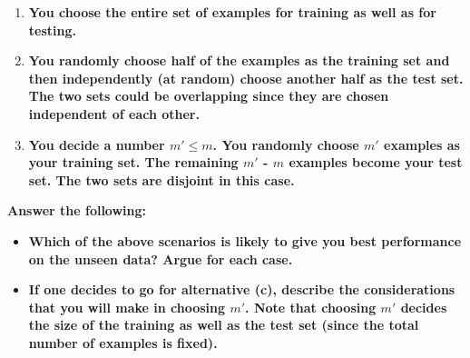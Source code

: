 \documentclass{article}
\begin{document}
\begin{enumerate}

    \item \textbf{You choose the entire set of examples for training as well as for testing.}
    \item \textbf{You randomly choose half of the examples as the training set and then independently (at random) choose another half as the test set. The two sets could be overlapping since they are chosen independent of each other.}
    \item \textbf{You decide a number $m' \leq m$. You randomly choose $m'$ examples as your training set. The remaining $m'$ - $m$ examples become your test set. The two sets are disjoint in this case.}
\end{enumerate}
\textbf{Answer the following:}

\begin{itemize}
\\
    \item \textbf{Which of the above scenarios is likely to give you best performance on the unseen data? Argue for each case.}
    \item \textbf{If one decides to go for alternative (c), describe the considerations that you will make in choosing $m'$. Note that choosing $m'$ decides the size of the training as well as the test set (since the total number of examples is fixed).}
\end{itemize}
\end{document}
